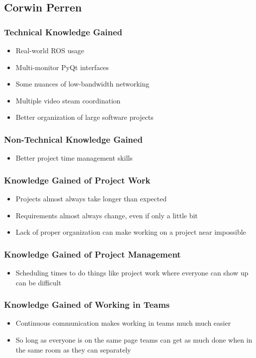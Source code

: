 \subsection{Corwin Perren}
\subsubsection{Technical Knowledge Gained}
\begin{itemize}
\item Real-world ROS usage
\item Multi-monitor PyQt interfaces
\item Some nuances of low-bandwidth networking
\item Multiple video steam coordination
\item Better organization of large software projects
\end{itemize}

\subsubsection{Non-Technical Knowledge Gained}
\begin{itemize}
\item Better project time management skills
\end{itemize}

\subsubsection{Knowledge Gained of Project Work}
\begin{itemize}
\item Projects almost always take longer than expected
\item Requirements almost always change, even if only a little bit
\item Lack of proper organization can make working on a project near impossible
\end{itemize}

\subsubsection{Knowledge Gained of Project Management}
\begin{itemize}
\item Scheduling times to do things like project work where everyone can show up can be difficult
\end{itemize}

\subsubsection{Knowledge Gained of Working in Teams}
\begin{itemize}
\item Continuous communication makes working in teams much much easier
\item So long as everyone is on the same page teams can get as much done when in the same room as they can separately
\end{itemize}

